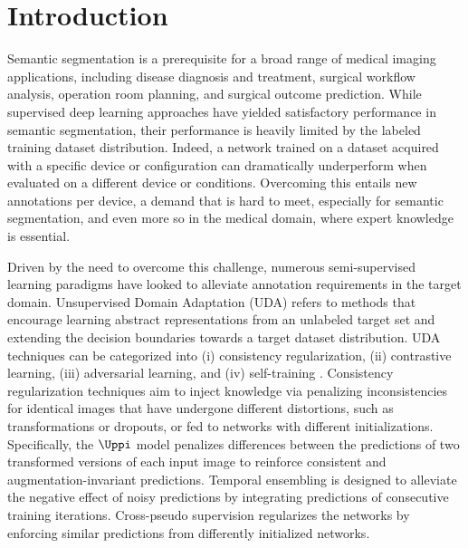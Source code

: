 \section{Introduction}
\label{sec:tist_introduction}

Semantic segmentation is a prerequisite for a broad range of medical imaging applications, including disease diagnosis and treatment, surgical workflow analysis, operation room planning, and surgical outcome prediction. While supervised deep learning approaches have yielded satisfactory performance in semantic segmentation, their performance is heavily limited by the labeled training dataset distribution. Indeed, a network trained on a dataset acquired with a specific device or configuration can dramatically underperform when evaluated on a different device or conditions. Overcoming this entails new annotations per device, a demand that is hard to meet, especially for semantic segmentation, and even more so in the medical domain, where expert knowledge is essential.

Driven by the need to overcome this challenge, numerous semi-supervised learning paradigms have looked to alleviate annotation requirements in the target domain. Unsupervised Domain Adaptation (UDA) refers to methods that encourage learning abstract representations from an unlabeled target set and extending the decision boundaries towards a target dataset distribution. UDA techniques can be categorized into (i) consistency regularization, (ii) contrastive learning, (iii) adversarial learning, and (iv) self-training . Consistency regularization techniques aim to inject knowledge via penalizing inconsistencies for identical images that have undergone different distortions, such as transformations or dropouts, or fed to networks with different initializations. Specifically, the $\Uppi$ model penalizes differences between the predictions of two transformed versions of each input image to reinforce consistent and augmentation-invariant predictions. Temporal ensembling is designed to alleviate the negative effect of noisy predictions by integrating predictions of consecutive training iterations. Cross-pseudo supervision regularizes the networks by enforcing similar predictions from differently initialized networks. 



